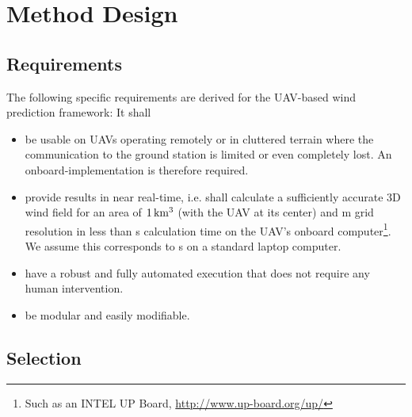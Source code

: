 \documentclass[twocolumn,letterpaper]{IEEEAerospaceCLS}
\begin{document}
\section{Method Design}
\label{sec:PL_WindPred_MethodSelection}


\subsection{Requirements}

The following specific requirements are derived for the UAV-based wind prediction framework: It shall

\begin{itemize}
\item be usable on UAVs operating remotely or in cluttered terrain where the communication to the ground station is limited or even completely lost. An onboard-implementation is therefore required.
\item provide results in near real-time, i.e. shall calculate a sufficiently accurate 3D wind field for an area of $\unit[1]{km^3}$ (with the \ac{UAV} at its center) and \unit[25]{m} grid resolution in less than \unit[30]{s} calculation time on the UAV's onboard computer\footnote{Such as an INTEL UP Board, \url{http://www.up-board.org/up/}}. We assume this corresponds to \unit[10]{s} on a standard laptop computer.
\item have a robust and fully automated execution that does not require any human intervention.
\item be modular and easily modifiable.
\end{itemize}

\subsection{Selection}
\end{document}
